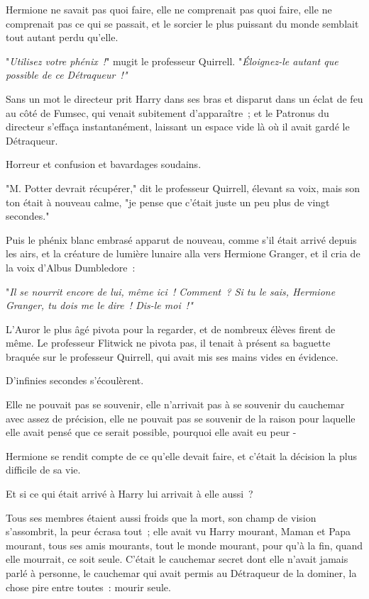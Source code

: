 Hermione ne savait pas quoi faire, elle ne comprenait pas quoi faire, elle ne comprenait pas ce qui se passait, et le sorcier le plus puissant du monde semblait tout autant perdu qu'elle.

"\emph{Utilisez votre phénix~!}" mugit le professeur Quirrell. "\emph{Éloignez-le autant que possible de ce Détraqueur~!"}

Sans un mot le directeur prit Harry dans ses bras et disparut dans un éclat de feu au côté de Fumsec, qui venait subitement d'apparaître~; et le Patronus du directeur s'effaça instantanément, laissant un espace vide là où il avait gardé le Détraqueur.

Horreur et confusion et bavardages soudains.

"M. Potter devrait récupérer," dit le professeur Quirrell, élevant sa voix, mais son ton était à nouveau calme, "je pense que c'était juste un peu plus de vingt secondes."

Puis le phénix blanc embrasé apparut de nouveau, comme s'il était arrivé depuis les airs, et la créature de lumière lunaire alla vers Hermione Granger, et il cria de la voix d'Albus Dumbledore~:

"\emph{Il se nourrit encore de lui, même ici~! Comment~? Si tu le sais, Hermione Granger, tu dois me le dire~! Dis-le moi~!"}

L'Auror le plus âgé pivota pour la regarder, et de nombreux élèves firent de même. Le professeur Flitwick ne pivota pas, il tenait à présent sa baguette braquée sur le professeur Quirrell, qui avait mis ses mains vides en évidence.

D'infinies secondes s'écoulèrent.

Elle ne pouvait pas se souvenir, elle n'arrivait pas à se souvenir du cauchemar avec assez de précision, elle ne pouvait pas se souvenir de la raison pour laquelle elle avait pensé que ce serait possible, pourquoi elle avait eu peur -

Hermione se rendit compte de ce qu'elle devait faire, et c'était la décision la plus difficile de sa vie.

Et si ce qui était arrivé à Harry lui arrivait à elle aussi~?

Tous ses membres étaient aussi froids que la mort, son champ de vision s'assombrit, la peur écrasa tout~; elle avait vu Harry mourant, Maman et Papa mourant, tous ses amis mourants, tout le monde mourant, pour qu'à la fin, quand elle mourrait, ce soit seule. C'était le cauchemar secret dont elle n'avait jamais parlé à personne, le cauchemar qui avait permis au Détraqueur de la dominer, la chose pire entre toutes~: mourir seule.

